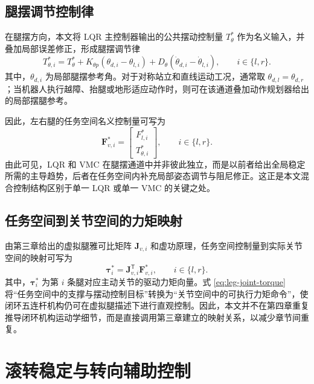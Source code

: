 \subsection{腿摆调节控制律}

在腿摆方向，本文将 LQR 主控制器输出的公共摆动控制量 $T_{\theta}^{\ast}$ 作为名义输入，并叠加局部误差修正，形成腿摆调节律
\begin{equation}
  T_{\theta,i}^{\ast}
  =
  T_{\theta}^{\ast}
  +
  K_{\theta p}(\theta_{d,i} - \theta_{l,i})
  +
  D_{\theta}(\dot{\theta}_{d,i} - \dot{\theta}_{l,i}),
  \qquad i \in \{l,r\}.
  \label{eq:leg-swing-law}
\end{equation}
其中，$\theta_{d,i}$ 为局部腿摆参考角。对于对称站立和直线运动工况，通常取 $\theta_{d,l} = \theta_{d,r}$；当机器人执行越障、抬腿或地形适应动作时，则可在该通道叠加动作规划器给出的局部摆腿参考。

因此，左右腿的任务空间名义控制量可写为
\begin{equation}
  \boldsymbol{F}_{v,i}^{\ast}
  =
  \begin{bmatrix}
    F_{l,i}^{\ast} \\
    T_{\theta,i}^{\ast}
  \end{bmatrix},
  \qquad i \in \{l,r\}.
  \label{eq:task-space-input}
\end{equation}
由此可见，LQR 和 VMC 在腿摆通道中并非彼此独立，而是以前者给出全局稳定所需的主导趋势，后者在任务空间内补充局部姿态调节与阻尼修正。这正是本文混合控制结构区别于单一 LQR 或单一 VMC 的关键之处。

\subsection{任务空间到关节空间的力矩映射}

由第三章给出的虚拟腿雅可比矩阵 $\boldsymbol{J}_{v,i}$ 和虚功原理，任务空间控制量到实际关节空间的映射可写为
\begin{equation}
  \boldsymbol{\tau}_{i}^{\ast}
  =
  \boldsymbol{J}_{v,i}^{\mathsf{T}}\boldsymbol{F}_{v,i}^{\ast},
  \qquad i \in \{l,r\}.
  \label{eq:leg-joint-torque}
\end{equation}
其中，$\boldsymbol{\tau}_{i}^{\ast}$ 为第 $i$ 条腿对应主动关节的驱动力矩向量。式 \eqref{eq:leg-joint-torque} 将“任务空间中的支撑与摆动控制目标”转换为“关节空间中的可执行力矩命令”，使闭环五连杆机构仍可在虚拟腿描述下进行直观控制。因此，本文并不在第四章重复推导闭环机构运动学细节，而是直接调用第三章建立的映射关系，以减少章节间重复。

\section{滚转稳定与转向辅助控制}

